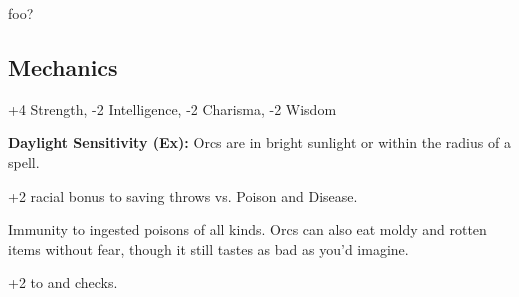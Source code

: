 
foo?

\subsection{Mechanics}

\begin{itemize*}
\item {}
\item {}
\item {}
\item {}
\item +4 Strength, -2 Intelligence, -2 Charisma, -2 Wisdom
\item \textbf{Daylight Sensitivity (Ex):} Orcs are  in bright sunlight or within the radius of a  spell.
\item +2 racial bonus to saving throws vs. Poison and Disease.
\item Immunity to ingested poisons of all kinds. Orcs can also eat moldy and rotten items without fear, though it still tastes as bad as you'd imagine.
\item +2 to  and  checks.
\item {}
\item {}
\item {}
\end{itemize*}

